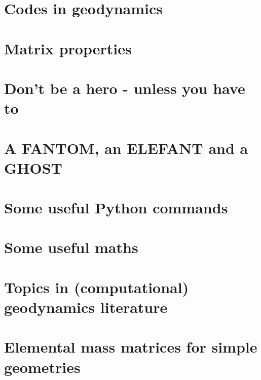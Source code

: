 \documentclass[a4paper]{article}
\numberwithin{equation}{section}
\begin{document}
\section{Codes in geodynamics \label{app:codes} } %
\newpage %
\section{Matrix properties}  %
\newpage %
\section{Don’t be a hero - unless you have to}  %
\newpage %
\section{A FANTOM, an ELEFANT and a GHOST}  %
\newpage %
\section{Some useful Python commands}  %
\newpage %
\section{Some useful maths}  \label{app_maths} %
\newpage %
\section{Topics in (computational) geodynamics literature}\label{app:topics}
\newpage %
\section{Elemental mass matrices for simple geometries}\label{app:mm} 
\newpage %
\end{document}
